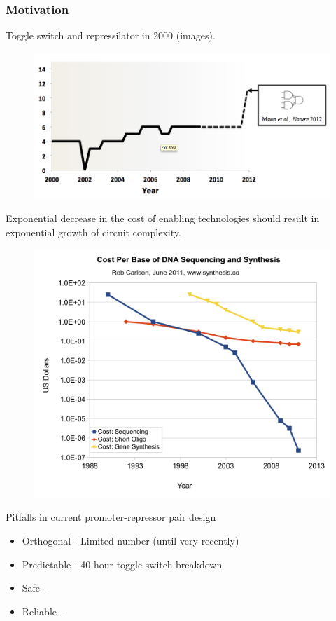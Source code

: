 \documentclass{beamer}
\begin{document}
\begin{frame}
\frametitle{Motivation}

Toggle switch and repressilator in 2000 (images). 

\begin{figure}[ht]
  \includegraphics[scale=0.3]{circuit_complexity.png}
\end{figure}

\end{frame}

\begin{frame}
Exponential decrease in the cost of enabling technologies should result 
in exponential growth of circuit complexity. 

\begin{figure}[ht]
  \includegraphics[scale=0.3]{cost_per_base.png}
\end{figure}

\begin{block}{Pitfalls in current promoter-repressor pair design}
  \begin{itemize}
    \item Orthogonal  - Limited number (until very recently)
    \item Predictable - 40 hour toggle switch breakdown 
    \item Safe        -  
    \item Reliable -
  \end{itemize}
\end{block}

\end{frame}
\end{document}
